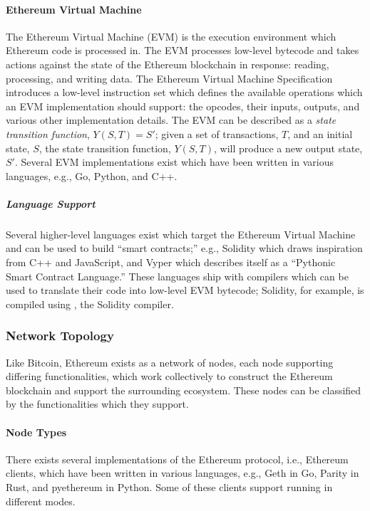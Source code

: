 \paragraph{Ethereum Virtual Machine}\label{eth:evm}
The Ethereum Virtual Machine (EVM) is the execution environment which Ethereum
code is processed in. The EVM processes low-level bytecode and takes actions
against the state of the Ethereum blockchain in response: reading, processing,
and writing data. The Ethereum Virtual Machine Specification introduces a
low-level instruction set which defines the available operations which an EVM
implementation should support: the opcodes, their inputs, outputs, and various
other implementation details. The EVM can be described as a \emph{state
transition function}, $Y(S, T) = S'$; given a set of transactions, $T$, and an
initial state, $S$, the state transition function, $Y(S, T)$, will produce a new
output state, $S'$.\cite{ethereum-yellow} Several EVM implementations exist
which have been written in various languages, e.g., Go, Python, and C++.

\subparagraph{Language Support}\label{eth:languages}
Several higher-level languages exist which target the Ethereum Virtual Machine
and can be used to build ``smart contracts;'' e.g., Solidity which draws
inspiration from C++ and JavaScript, and Vyper which describes itself as a
``Pythonic Smart Contract Language.'' These languages ship with compilers which
can be used to translate their code into low-level EVM bytecode; Solidity, for
example, is compiled using , the Solidity compiler.

\subsubsection{Network Topology}
Like Bitcoin, Ethereum exists as a network of nodes, each node supporting
differing functionalities, which work collectively to construct the Ethereum
blockchain and support the surrounding ecosystem. These nodes can be classified
by the functionalities which they support.

\paragraph{Node Types}
There exists several implementations of the Ethereum protocol, i.e., Ethereum
clients, which have been written in various languages, e.g., Geth in Go, Parity
in Rust, and pyethereum in Python. Some of these clients support running in
different modes.

